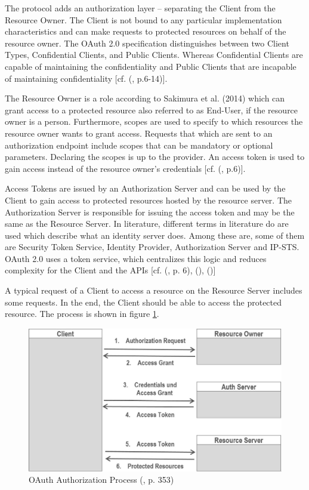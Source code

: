 {{		The protocol adds an authorization layer – separating the Client from the Resource Owner. 
		The Client is not bound to any particular implementation characteristics and can make requests to protected resources on behalf of the resource owner. The OAuth 2.0 specification distinguishes between two Client Types, Confidential Clients, and Public Clients. Whereas Confidential Clients are capable of maintaining the confidentiality and Public Clients that are incapable of maintaining confidentiality [cf. (\cite{Hardt:2012:OAuth2}, p.6-14)].
		
		The Resource Owner is a role according to Sakimura et al. (2014) which can grant access to a protected resource also referred to as End-User, if the resource owner is a person. Furthermore, scopes are used to specify to which resources the resource owner wants to grant access. Requests that which are sent to an authorization endpoint include scopes that can be mandatory or optional parameters. Declaring the scopes is up to the provider. An access token is used to gain access instead of the resource owner’s credentials [cf. (\cite{Sakimura:2014:OpenIDConnect}, p.6)]. 
		
		Access Tokens are issued by an Authorization Server and can be used by the Client to gain access to protected resources hosted by the resource server. The Authorization Server is responsible for issuing the access token and may be the same as the Resource Server. In literature, different terms in literature do are used which describe what an identity server does. Among these are, some of them are Security Token Service, Identity Provider, Authorization Server and IP-STS. OAuth 2.0 uses a token service, which centralizes this logic and reduces complexity for the Client and the APIs [cf. (\cite{Sakimura:2014:OpenIDConnect}, p. 6), (\cite{Brock:2018:ID4}), (\cite{Boyd:2012:GSOAuth})]
		
		A typical request of a Client to access a resource on the Resource Server includes some requests. In the end, the Client should be able to access the protected resource. The process is shown in figure \ref{fig:oaut-process2}.
		
		\begin{figure}[h]
			\centering
			\includegraphics[width=0.8\linewidth]{images/oaut-process2}
			\caption{OAuth Authorization Process (\cite{LeBlanc:2011:SocialApplications}, p. 353)}
			\label{fig:oaut-process2}
		\end{figure}
		
}}
